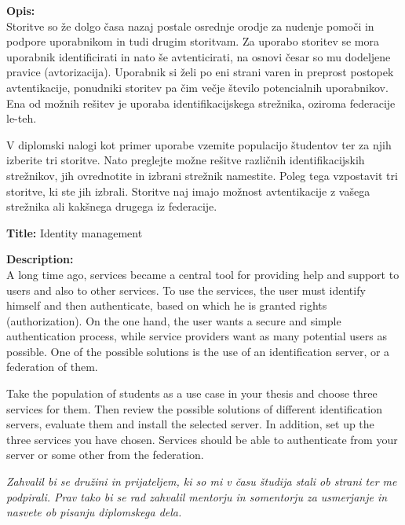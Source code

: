 \documentclass[a4paper,12pt,openright,oneside]{book}
\newcommand{\clearemptydoublepage}{\newpage{\pagestyle{empty}\cleardoublepage}}
\begin{document}
\bigskip
\noindent\textbf{Opis:}\\
Storitve so že dolgo časa nazaj postale osrednje orodje za nudenje pomoči in podpore uporabnikom in tudi drugim storitvam. Za uporabo storitev se mora uporabnik identificirati in nato še avtenticirati, na osnovi česar so mu dodeljene pravice (avtorizacija). Uporabnik si želi po eni strani varen in preprost postopek avtentikacije, ponudniki storitev pa čim večje število potencialnih uporabnikov. Ena od možnih rešitev je uporaba identifikacijskega strežnika, oziroma federacije le-teh.

V diplomski nalogi kot primer uporabe vzemite populacijo študentov ter za njih izberite tri storitve.
Nato preglejte možne rešitve različnih identifikacijskih strežnikov, jih ovrednotite in izbrani strežnik namestite. Poleg tega vzpostavit tri storitve, ki ste jih izbrali. Storitve naj imajo možnost avtentikacije z vašega strežnika ali kakšnega drugega iz federacije.

\bigskip
\noindent\textbf{Title:} Identity management

\bigskip
\noindent\textbf{Description:}\\
A long time ago, services became a central tool for providing help and support to users and also to other services. To use the services, the user must identify himself and then authenticate, based on which he is granted rights (authorization). On the one hand, the user wants a secure and simple authentication process, while service providers want as many potential users as possible. One of the possible solutions is the use of an identification server, or a federation of them.

Take the population of students as a use case in your thesis and choose three services for them.
Then review the possible solutions of different identification servers, evaluate them and install the selected server. In addition, set up the three services you have chosen. Services should be able to authenticate from your server or some other from the federation.



\vfill



\vspace{2cm}

\clearemptydoublepage

\thispagestyle{empty}\mbox{}\vfill\null\it%
\noindent
Zahvalil bi se družini in prijateljem, ki so mi v času študija stali ob strani ter me podpirali.
Prav tako bi se rad zahvalil mentorju in somentorju za usmerjanje in nasvete ob pisanju diplomskega dela. 
\rm\normalfont
\end{document}
